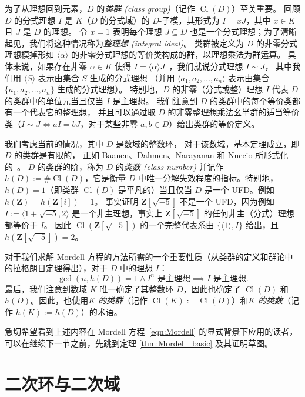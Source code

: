 \documentclass[sigplan,10pt,nonacm,
screen]{acmart} \settopmatter{printfolios=true,printccs=false,printacmref=false}
\newcommand{\coloneqq}{:=}
\newcommand{\ZZ}{\mathbf{Z}}
\DeclareMathOperator{\Cl}{Cl}
\begin{document}
为了从理想回到元素，$D$ 的\emph{类群 (class group)}（记作 $\Cl(D)$）至关重要。
回顾 $D$ 的分式理想 $I$ 是 $K$（$D$ 的分式域）的 $D$-子模，其形式为 $I=x J$，其中 $x \in K$ 且 $J$ 是 $D$ 的理想。
令 $x = 1$ 表明每个理想 $J \subseteq D$ 也是一个分式理想；为了清晰起见，我们将这种情况称为\emph{整理想 (integral ideal)}。
类群被定义为 $D$ 的非零分式理想模掉形如 $\langle \alpha \rangle$ 的非零分式理想的等价类构成的群，以理想乘法为群运算。
具体来说，如果存在非零 $\alpha \in K$ 使得 $ I = \langle \alpha \rangle J $~\cite[第 2 节]{baanen_formalization_2021}，我们就说分式理想 $I \sim J$，
其中我们用 $ \langle S \rangle$ 表示由集合 $S$ 生成的分式理想
（并用 $\langle a_1, a_2, \dots, a_n\rangle$ 表示由集合 $\{a_1, a_2, \dots, a_n\}$ 生成的分式理想）。
特别地，$D$ 的非零（分式或整）理想 $I$ 代表 $D$ 的类群中的单位元当且仅当 $I$ 是主理想。
我们注意到 $D$ 的类群中的每个等价类都有一个代表它的整理想，
并且可以通过取 $D$ 的非零整理想乘法幺半群的适当等价类（$I \sim J \Leftrightarrow aI=bJ$，对于某些非零 $a,b \in D$）给出类群的等价定义。

我们考虑当前的情况，其中 $D$ 是数域的整数环，
对于该数域，基本定理成立，即 $D$ 的类群是有限的，
正如 Baanen、Dahmen、Narayanan 和 Nuccio 所形式化的~\cite{baanen_formalization_2021}。
$D$ 的类群的阶，称为 $D$ 的\emph{类数 (class number)} 并记作 $h(D)\coloneqq\#\Cl(D)$，它是衡量 $D$ 中唯一分解失效程度的指标。特别地，$h(D)=1$（即类群 $\Cl(D)$ 是平凡的）当且仅当 $D$ 是一个 UFD。例如 $h(\ZZ)=h(\ZZ[i])=1$。
事实证明 $\ZZ[\sqrt{-5}]$ 不是一个 UFD，因为例如 $I:=\langle 1+\sqrt{-5},2\rangle$ 是一个非主理想，事实上 $\ZZ[\sqrt{-5}]$ 的任何非主（分式）理想都等价于 $I$。
因此 $\Cl(\ZZ[\sqrt{-5}])$ 的一个完整代表系由 $\{\langle 1 \rangle,I\}$ 给出，且 $h(\ZZ[\sqrt{-5}])=2$。

对于我们求解 Mordell 方程的方法所需的一个重要性质（从类群的定义和群论中的拉格朗日定理得出），对于 $D$ 中的理想 $I$：
\begin{equation}\label{eqn:principality_from_power}
 \gcd(n,h(D))=1 \wedge I^n \text{ 是主理想} \implies I \text{ 是主理想}.
\end{equation}
最后，我们注意到数域 $K$ 唯一确定了其整数环 $D$，因此也确定了 $\Cl(D)$ 和 $h(D)$。因此，也使用\emph{$K$ 的类群}（记作 $\Cl(K)\coloneqq\Cl(D)$）和\emph{$K$ 的类数}（记作 $h(K)\coloneqq h(D)$）的术语。

急切希望看到上述内容在 Mordell 方程~\eqref{eqn:Mordell} 的显式背景下应用的读者，可以在继续下一节之前，先跳到定理 \ref{thm:Mordell_basic} 及其证明草图。
\section{二次环与二次域}\label{sec:QuadraticRings}
\end{document}
